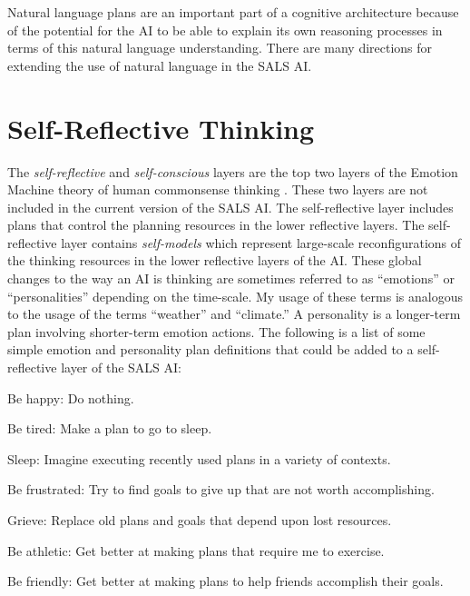 Natural language plans are an important part of a cognitive
architecture because of the potential for the AI to be able to explain
its own reasoning processes in terms of this natural language
understanding.  There are many directions for extending the use of
natural language in the SALS AI.


\section{Self-Reflective Thinking}

The {\emph{self-reflective}} and {\emph{self-conscious}} layers are
the top two layers of the Emotion Machine theory of human commonsense
thinking \cite[]{minsky:2006}.  These two layers are not included in
the current version of the SALS AI.  The self-reflective layer
includes plans that control the planning resources in the lower
reflective layers.  The self-reflective layer contains
{\emph{self-models}} which represent large-scale reconfigurations of
the thinking resources in the lower reflective layers of the AI.
These global changes to the way an AI is thinking are sometimes
referred to as ``emotions'' or ``personalities'' depending on the
time-scale.  My usage of these terms is analogous to the usage of the
terms ``weather'' and ``climate.''  A personality is a longer-term
plan involving shorter-term emotion actions.  The following is a list
of some simple emotion and personality plan definitions that could be
added to a self-reflective layer of the SALS AI:

\begin{packed_itemize}
\item{Be happy: Do nothing.}
\item{Be tired: Make a plan to go to sleep.}
\item{Sleep: Imagine executing recently used plans in a variety of
  contexts.}
\item{Be frustrated: Try to find goals to give up that are not worth
  accomplishing.}
\item{Grieve: Replace old plans and goals that depend upon lost
  resources.}
\item{Be athletic: Get better at making plans that require me to exercise.}
\item{Be friendly: Get better at making plans to help friends accomplish their goals.}
\end{packed_itemize}


